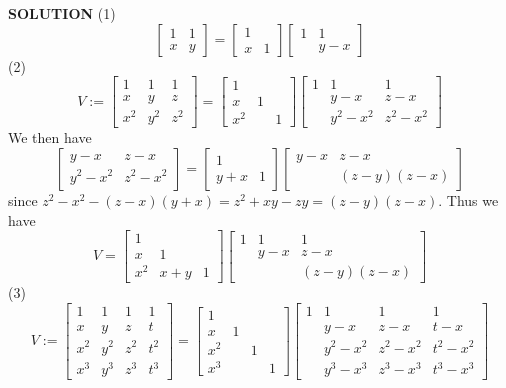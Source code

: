 \documentclass[12pt,a4paper]{article}
\begin{document}
\textbf{SOLUTION} (1)
\[
\begin{bmatrix}
1 & 1 \\
x & y
\end{bmatrix} =  \begin{bmatrix}
1 &  \\
x & 1
\end{bmatrix} \begin{bmatrix}
1 & 1 \\
 & y-x
\end{bmatrix}
\]
(2)
\[
V := \begin{bmatrix}
1 & 1 & 1 \\
x & y & z \\
x^2 & y^2 & z^2
\end{bmatrix} =  \begin{bmatrix}
1 &  \\
x & 1 \\
x^2 && 1
\end{bmatrix} \begin{bmatrix}
1 & 1 & 1\\
 & y-x & z-x \\
 & y^2-x^2 & z^2 - x^2
\end{bmatrix}
\]
We then have
\[
\begin{bmatrix}
 y-x & z-x \\
 y^2-x^2 & z^2 - x^2
\end{bmatrix} = \begin{bmatrix}
 1 &  \\
 y+x & 1
\end{bmatrix} \begin{bmatrix}
y-x & z-x \\
& (z-y)(z-x)
\end{bmatrix}
\]
since $z^2 - x^2 - (z-x) (y+x) = z^2 + xy  - zy = (z-y)(z-x)$. Thus we have
\[
V = \begin{bmatrix}
1 &  \\
x & 1 \\
x^2 & x+y& 1
\end{bmatrix}  \begin{bmatrix}
1 & 1 & 1\\
 & y-x & z-x \\
 &  &  (z-y)(z-x)
\end{bmatrix}
\]
(3)
\[
V := \begin{bmatrix}
1 & 1 & 1 & 1 \\
x & y & z & t \\
x^2 & y^2 & z^2 & t^2 \\
x^3 & y^3 & z^3 & t^3
\end{bmatrix} =
\begin{bmatrix}
1 &  \\
x & 1 \\
x^2 && 1 \\
x^3 &&& 1
\end{bmatrix} \begin{bmatrix}
1 & 1 & 1 & 1\\
 & y-x & z-x & t-x \\
 & y^2-x^2 & z^2 - x^2 & t^2 - x^2 \\
 & y^3-x^3 & z^3 - x^3 & t^3 - x^3
\end{bmatrix}
\]
\end{document}
